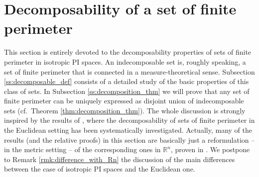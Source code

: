 \documentclass[reqno]{amsart}
\numberwithin{equation}{section}
\newcommand{\R}{\mathbb{R}}
\newcommand{\1}{\mathbbm 1}
\begin{document}
\section{Decomposability of a set of finite perimeter}\label{s:decomposition}
%
%
This section is entirely devoted to the decomposability
properties of sets of finite perimeter in isotropic PI spaces.
An indecomposable set is, roughly speaking, a set of finite
perimeter that is connected in a measure-theoretical sense.
Subsection \ref{ss:decomposable_def} consists of a detailed
study of the basic properties of this class of sets. In
Subsection \ref{ss:decomposition_thm} we will prove that
any set of finite perimeter can be uniquely expressed as
disjoint union of indecomposable sets (cf.\ Theorem \ref{thm:decomposition_thm}).
The whole discussion is strongly inspired by the results of
\cite{ACMM01}, where the decomposability of sets of finite perimeter
in the Euclidean setting has been systematically investigated.
Actually, many of the results (and the relative proofs) in this section are
basically just a reformulation -- in the metric setting -- of the corresponding
ones in \(\R^n\), proven in \cite{ACMM01}. We postpone to Remark
\ref{rmk:difference_with_Rn} the discussion of the main differences
between the case of isotropic PI spaces and the Euclidean one.
%
%
\end{document}
